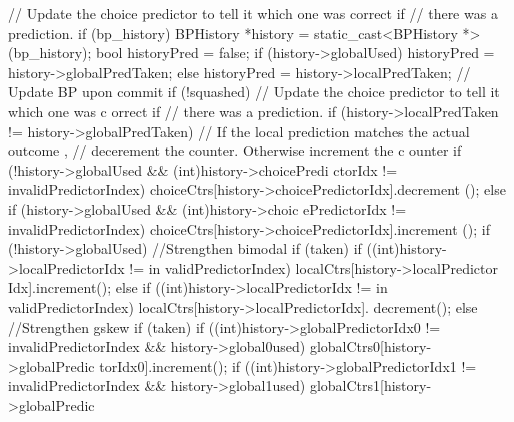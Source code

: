 \begin{DoxyCode}
{
    // Update the choice predictor to tell it which one was correct if
    // there was a prediction.
    if (bp_history) {
        BPHistory *history = static_cast<BPHistory *>(bp_history);
        bool historyPred = false;
        if (history->globalUsed) {
           historyPred = history->globalPredTaken;
        } else {
           historyPred = history->localPredTaken;
        }
                // Update BP upon commit
                if (!squashed) {
                        // Update the choice predictor to tell it which one was c
      orrect if
                        // there was a prediction.
                        if (history->localPredTaken != history->globalPredTaken) 
      {
                            // If the local prediction matches the actual outcome
      ,
                            // decerement the counter.  Otherwise increment the c
      ounter
                            if (!history->globalUsed && (int)history->choicePredi
      ctorIdx != invalidPredictorIndex) {
                                choiceCtrs[history->choicePredictorIdx].decrement
      ();
                            } else if (history->globalUsed && (int)history->choic
      ePredictorIdx != invalidPredictorIndex) {
                                choiceCtrs[history->choicePredictorIdx].increment
      ();
                            }
                        }
                        if (!history->globalUsed) {
                           //Strengthen bimodal
                                if (taken) {
                                        if ((int)history->localPredictorIdx != in
      validPredictorIndex)
                                                localCtrs[history->localPredictor
      Idx].increment();
                                } else {
                                        if ((int)history->localPredictorIdx != in
      validPredictorIndex)
                                           localCtrs[history->localPredictorIdx].
      decrement();
                                }
                        } else {
                           //Strengthen gskew
                                if (taken) {
                                        if ((int)history->globalPredictorIdx0 != 
      invalidPredictorIndex && history->global0used)
                                                globalCtrs0[history->globalPredic
      torIdx0].increment();
                                        if ((int)history->globalPredictorIdx1 != 
      invalidPredictorIndex && history->global1used)
                                                globalCtrs1[history->globalPredic
}}}}}
\end{DoxyCode}
